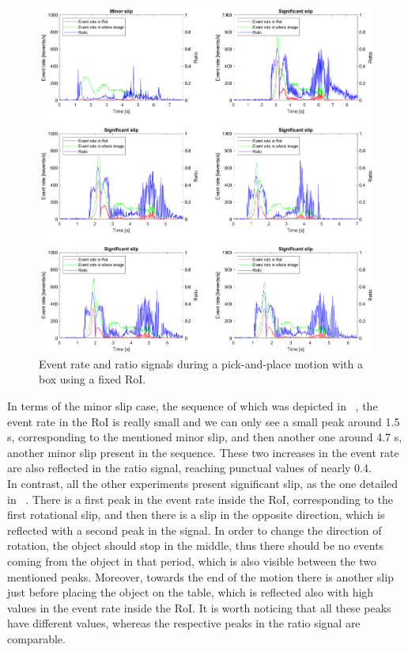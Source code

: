 \begin{figure}[h]
    \centering
    \includegraphics[width=\textwidth]{resources/images/fix_roi_set}
    \caption{Event rate and ratio signals during a pick-and-place motion with a box using a fixed RoI.}\label{fig:fix_roi_set}
\end{figure}

In terms of the minor slip case, the sequence of which was depicted in ~, the event rate in the RoI is really small and we can only see a small peak around 1.5 s, corresponding to the mentioned minor slip, and then another one around 4.7 s, another minor slip present in the sequence. These two increases in the event rate are also reflected in the ratio signal, reaching punctual values of nearly 0.4.\\

In contrast, all the other experiments present significant slip, as the one detailed in ~. There is a first peak in the event rate inside the RoI, corresponding to the first rotational slip, and then there is a slip in the opposite direction, which is reflected with a second peak in the signal. In order to change the direction of rotation, the object should stop in the middle, thus there should be no events coming from the object in that period, which is also visible between the two mentioned peaks. Moreover, towards the end of the motion there is another slip just before placing the object on the table, which is reflected also with high values in the event rate inside the RoI. It is worth noticing that all these peaks have different values, whereas the respective peaks in the ratio signal are comparable.\\

